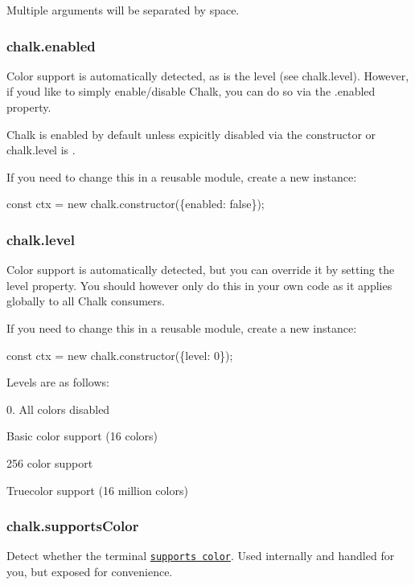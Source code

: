 Multiple arguments will be separated by space.

\subsubsection*{chalk.\+enabled}

Color support is automatically detected, as is the level (see {\ttfamily chalk.\+level}). However, if you\textquotesingle{}d like to simply enable/disable Chalk, you can do so via the {\ttfamily .enabled} property.

Chalk is enabled by default unless expicitly disabled via the constructor or {\ttfamily chalk.\+level} is {}.

If you need to change this in a reusable module, create a new instance\+:


\begin{DoxyCode}
const ctx = new chalk.constructor(\{enabled: false\});
\end{DoxyCode}


\subsubsection*{chalk.\+level}

Color support is automatically detected, but you can override it by setting the {\ttfamily level} property. You should however only do this in your own code as it applies globally to all Chalk consumers.

If you need to change this in a reusable module, create a new instance\+:


\begin{DoxyCode}
const ctx = new chalk.constructor(\{level: 0\});
\end{DoxyCode}


Levels are as follows\+:

0. All colors disabled
\begin{DoxyEnumerate}
\item Basic color support (16 colors)
\item 256 color support
\item Truecolor support (16 million colors)
\end{DoxyEnumerate}

\subsubsection*{chalk.\+supports\+Color}

Detect whether the terminal \href{https://github.com/chalk/supports-color}{\tt supports color}. Used internally and handled for you, but exposed for convenience.

